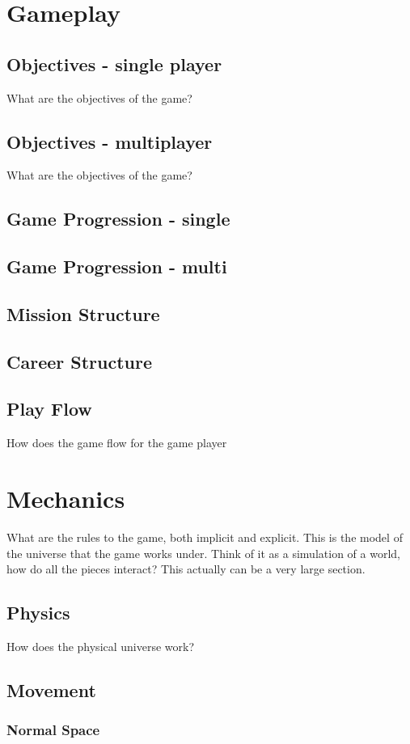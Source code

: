 \section{Gameplay}
\subsection{Objectives - single player}
  What are the objectives of the game?
\subsection{Objectives - multiplayer}
  What are the objectives of the game?
\subsection{Game Progression - single}
\subsection{Game Progression - multi}
\subsection{Mission Structure}
\subsection{Career Structure}
\subsection{Play Flow}
  How does the game flow for the game player
\section{Mechanics}
  What are the rules to the game, both implicit and explicit.  This is the model of the universe that the game works under.  Think of it as a simulation of a world, how do all the pieces interact?  This actually can be a very large section.
\subsection{Physics}
  How does the physical universe work?
\subsection{Movement}
\subsubsection{Normal Space}
